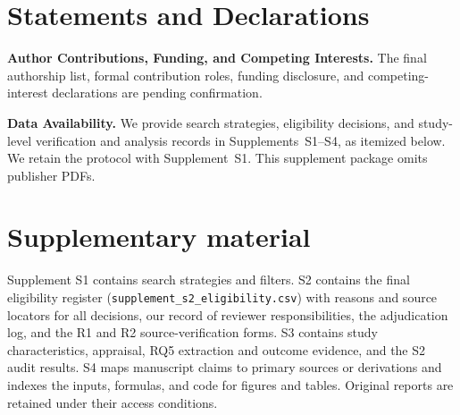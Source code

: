 \documentclass[pdflatex,sn-vancouver-num]{sn-jnl}
\begin{document}
\section*{Statements and Declarations}
\textbf{Author Contributions, Funding, and Competing Interests.} The final authorship list, formal contribution roles, funding disclosure, and competing-interest declarations are pending confirmation. \par\textbf{Data Availability.} We provide search strategies, eligibility decisions, and study-level verification and analysis records in Supplements~S1--S4, as itemized below. We retain the protocol with Supplement~S1. This supplement package omits publisher PDFs.

\section*{Supplementary material}
Supplement S1 contains search strategies and filters. S2 contains the final eligibility register (\nolinkurl{supplement_s2_eligibility.csv}) with reasons and source locators for all decisions, our record of reviewer responsibilities, the adjudication log, and the R1 and R2 source-verification forms. S3 contains study characteristics, appraisal, RQ5 extraction and outcome evidence, and the S2 audit results. S4 maps manuscript claims to primary sources or derivations and indexes the inputs, formulas, and code for figures and tables. Original reports are retained under their access conditions.


\end{document}
